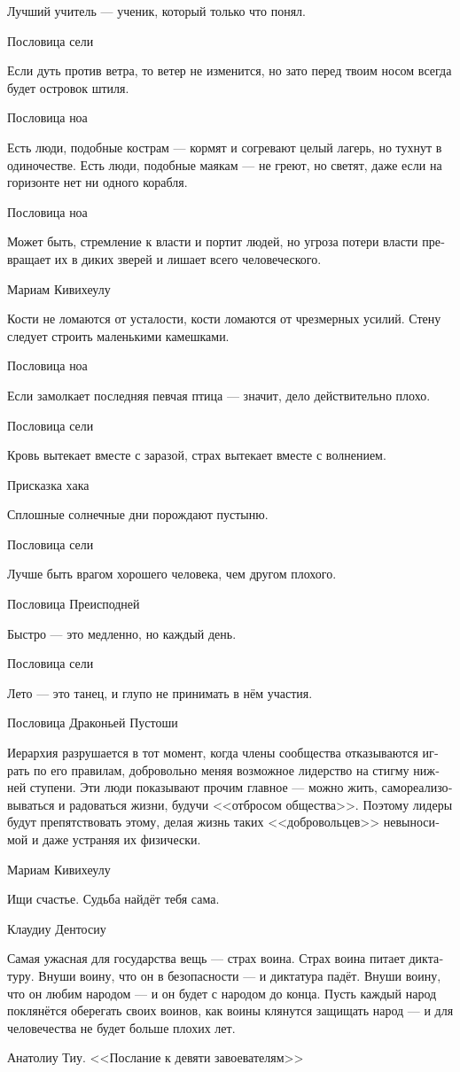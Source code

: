 \documentclass[a4paper,12pt,fleqn]{book}\usepackage{polyglossia}\setdefaultlanguage[babelshorthands=true]{russian}\setotherlanguage{english}\defaultfontfeatures{Ligatures=TeX,Mapping=tex-text}\usepackage{xcolor}\newcommand{\ml}[3]{#2}
\begin{document}
{\epigraph
{Лучший учитель --- ученик, который только что понял.}
{Пословица сели}

\epigraph
{Если дуть против ветра, то ветер не изменится, но зато перед твоим носом всегда будет островок штиля.}
{Пословица ноа}

\epigraph
{Есть люди, подобные кострам --- кормят и согревают целый лагерь, но тухнут в одиночестве.
Есть люди, подобные маякам --- не греют, но светят, даже если на горизонте нет ни одного корабля.}
{Пословица ноа}

\epigraph
{Может быть, стремление к власти и портит людей, но угроза потери власти превращает их в диких зверей и лишает всего человеческого.}
{Мариам Кивихеулу}

\epigraph
{Кости не ломаются от усталости, кости ломаются от чрезмерных усилий.
Стену следует строить маленькими камешками.}
{Пословица ноа}

\epigraph
{Если замолкает последняя певчая птица --- значит, дело действительно плохо.}
{Пословица сели}

\epigraph
{Кровь вытекает вместе с заразой, страх вытекает вместе с волнением.}
{Присказка хака}

\epigraph
{Сплошные солнечные дни порождают пустыню.}
{Пословица сели}

\epigraph
{Лучше быть врагом хорошего человека, чем другом плохого.}
{Пословица Преисподней}

\epigraph
{Быстро --- это медленно, но каждый день.}
{Пословица сели}

\epigraph
{Лето --- это танец, и глупо не принимать в нём участия.}
{Пословица Драконьей Пустоши}

\epigraph
{Иерархия разрушается в тот момент, когда члены сообщества отказываются играть по его правилам, добровольно меняя возможное лидерство на стигму нижней ступени.
Эти люди показывают прочим главное --- можно жить, самореализовываться и радоваться жизни, будучи <<отбросом общества>>.
Поэтому лидеры будут препятствовать этому, делая жизнь таких <<добровольцев>> невыносимой и даже устраняя их физически.}
{Мариам Кивихеулу}

\epigraph
{Ищи счастье.
Судьба найдёт тебя сама.}
{Клаудиу Дентосиу}

\epigraph
{Самая ужасная для государства вещь --- страх воина.
Страх воина питает диктатуру.
Внуши воину, что он в безопасности --- и диктатура падёт.
Внуши воину, что он любим народом --- и он будет с народом до конца.
Пусть каждый народ поклянётся оберегать своих воинов, как воины клянутся защищать народ --- и для человечества не будет больше плохих лет.}
{Анатолиу Тиу.
<<Послание к девяти завоевателям>>}

}
\end{document}
